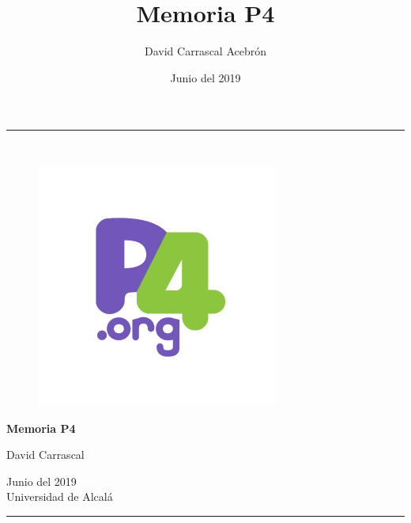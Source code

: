 \documentclass{book}
\title{Memoria P4}
\author{David Carrascal Acebrón}
\date{Junio del 2019}
\begin{document}
\begin{titlepage}	
	\begin{center}
	    \rule{150mm}{0.5mm}\\
		\bigskip
		\bigskip
		\bigskip
		\bigskip
		\bigskip
		\bigskip
		\bigskip
		\begin{figure}[!htb]
            \centering
            \includegraphics[width=0.5\linewidth]{./img/p4-diagram.png}
        \end{figure}
		\bigskip
		\bigskip
		\bigskip
		\bigskip
		\bigskip
		\begin{Large}
		\textbf{Memoria P4} \\
		\end{Large}
		\bigskip
		\bigskip
		\bigskip
		\bigskip
		\bigskip
		\bigskip
		\bigskip
		\bigskip
		\bigskip
		\bigskip
		\begin{large}
			David Carrascal \\
		\end{large}
		\bigskip
		\bigskip
		Junio del 2019 \\
		\bigskip
		Universidad de Alcalá \\
		\bigskip
		\bigskip
		\bigskip
		\rule{150mm}{0.5mm}\\
	\end{center}	
\end{titlepage}
\tableofcontents{}


 
 
 

{}



\end{document}

